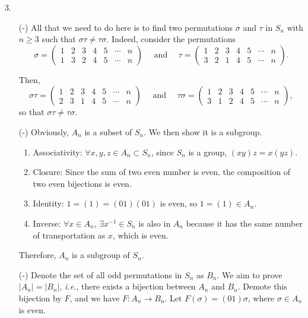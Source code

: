 \documentclass[12pt]{article}
\begin{document}
		3. \begin{enumerate}
			\item[(-)] All that we need to do here is to find two permutations $\sigma$ and $\tau$ in $S_n$ with $n \geqslant 3$ such that $\sigma \tau \neq \tau \sigma$. Indeed, consider the permutations
			$$
			\sigma=\left(\begin{array}{ccccccc}
			1 & 2 & 3 & 4 & 5 & \cdots & n \\
			1 & 3 & 2 & 4 & 5 & \cdots & n
			\end{array}\right) \quad \text { and } \quad \tau=\left(\begin{array}{ccccccc}
			1 & 2 & 3 & 4 & 5 & \cdots & n \\
			3 & 2 & 1 & 4 & 5 & \cdots & n
			\end{array}\right).
			$$
			\par Then,
			$$
			\sigma\tau=\left(\begin{array}{ccccccc}
			1 & 2 & 3 & 4 & 5 & \cdots & n \\
			2 & 3 & 1 & 4 & 5 & \cdots & n
			\end{array}\right) \quad \text { and } \quad \tau \sigma=\left(\begin{array}{ccccccc}
			1 & 2 & 3 & 4 & 5 & \cdots & n \\
			3 & 1 & 2 & 4 & 5 & \cdots & n
			\end{array}\right),
			$$
			so that $\sigma\tau \neq \tau\sigma.$
			\item[(-)] Obviously, $A_n$ is a subset of $S_n$. We then show it is a subgroup.
			\begin{enumerate}
				\item Associativity:  $\forall x,y,z \in A_n \subset S_n$, since $S_n$ is a group, $(xy)z = x(yz)$.
				\item Closure: Since the sum of two even number is even, the composition of two even bijections is even.
				\item Identity: $1 = (1) = (01)(01)$ is even, so $1 = (1) \in A_n$.
				\item Inverse: $\forall x \in A_n$, $\exists x^{-1} \in S_n$ is also in $A_n$ because it has the same number of transportation as $x$, which is even. 
			\end{enumerate}
			\par Therefore, $A_n$ is a subgroup of $S_n$.
			\item[(-)] Denote the set of all odd permutations in $S_n$ as $B_n$. We aim to prove $|A_n| = |B_n|$, \textit{i.e.}, there exists a bijection between $A_n$ and $B_n$. Demote this bijection by $F$, and we have $F: A_n \to B_n$. Let $F(\sigma) = (01)\sigma$, where $\sigma \in A_n$ is even.

\end{enumerate}
\end{document}
